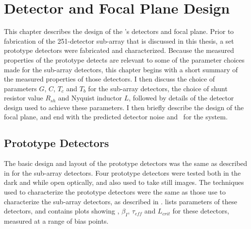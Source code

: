 \chapter{Detector and Focal Plane Design}\label{c:det-design}

This chapter describes the design of the \Imager's detectors and focal plane.
Prior to fabrication of the 251-detector sub-array that is discussed in this thesis, a set prototype detectors were fabricated and characterized.
Because the measured properties of the prototype detects are relevant to some of the parameter choices made for the sub-array detectors, this chapter begins with a short summary of the measured properties of those detectors.
I then discuss the choice of parameters $G$, $C$, $T_c$ and $T_b$ for the sub-array detectors, the choice of shunt resistor value $R_{sh}$ and Nyquist inductor $L$, followed by details of the detector design used to achieve these parameters.
I then briefly describe the design of the focal plane, and end with the predicted detector noise and \NETD\ for the system.

\section{Prototype Detectors} \label{sec:det-parm-choice}

The basic design and layout of the prototype detectors was the same as described in for the sub-array detectors.
Four prototype detectors were tested both in the dark and while open optically, and also used to take still images.
The techniques used to characterize the prototype detectors were the same as those use to characterize the sub-array detectors, as described in .
 lists parameters of these detectors, and  contains plots showing \Loop, $\beta_I$, $\tau_{eff}$ and $L_{crit}$ for these detectors, measured at a range of bias points.

